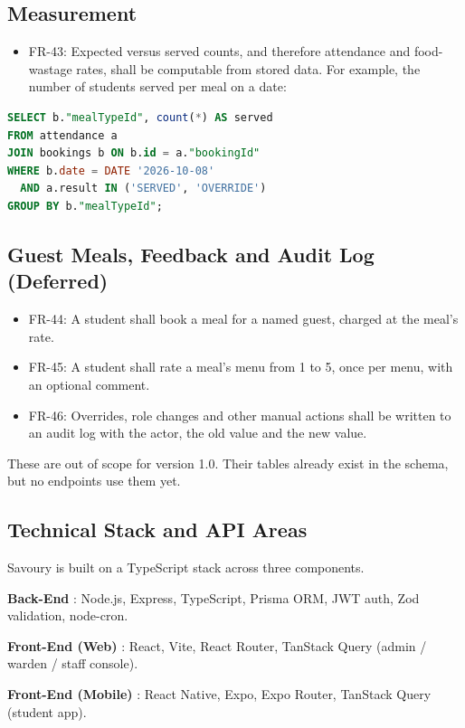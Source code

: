 \documentclass{scrreprt}
\begin{document}
\subsection{Measurement}
\begin{itemize}
    \item FR-43: Expected versus served counts, and therefore attendance and
    food-wastage rates, shall be computable from stored data. For example,
    the number of students served per meal on a date:
\end{itemize}

\begin{lstlisting}[language=SQL, basicstyle=\ttfamily\small]
SELECT b."mealTypeId", count(*) AS served
FROM attendance a
JOIN bookings b ON b.id = a."bookingId"
WHERE b.date = DATE '2026-10-08'
  AND a.result IN ('SERVED', 'OVERRIDE')
GROUP BY b."mealTypeId";
\end{lstlisting}

\subsection{Guest Meals, Feedback and Audit Log (Deferred)}
\begin{itemize}
    \item FR-44: A student shall book a meal for a named guest, charged at
    the meal's rate.
    \item FR-45: A student shall rate a meal's menu from 1 to 5, once per
    menu, with an optional comment.
    \item FR-46: Overrides, role changes and other manual actions shall be
    written to an audit log with the actor, the old value and the new value.
\end{itemize}

These are out of scope for version 1.0. Their tables already exist in
the schema, but no endpoints use them yet.

\subsection{Technical Stack and API Areas}
Savoury is built on a TypeScript stack across three components.

\textbf{Back-End} : Node.js, Express, TypeScript, Prisma ORM, JWT auth,
Zod validation, node-cron.

\textbf{Front-End (Web)} : React, Vite, React Router, TanStack Query
(admin / warden / staff console).

\textbf{Front-End (Mobile)} : React Native, Expo, Expo Router, TanStack
Query (student app).
\end{document}
